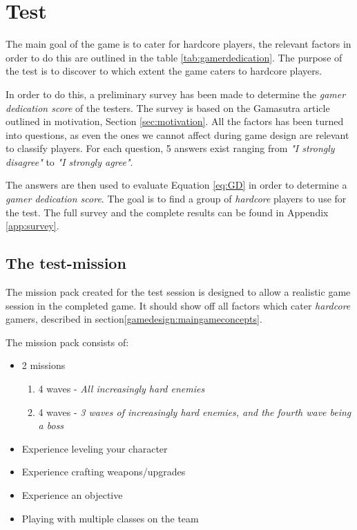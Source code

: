 \chapter{Test}
The main goal of the game is to cater for hardcore players, the relevant factors in order to do this are outlined in the table \ref{tab:gamerdedication}.
The purpose of the test is to discover to which extent the game caters to hardcore players.

In order to do this, a preliminary survey has been made to determine the \emph{gamer dedication score} of the testers.
The survey is based on the Gamasutra article\cite{casual_vs_hardcore} outlined in motivation, Section \ref{sec:motivation}.
All the factors has been turned into questions, as even the ones we cannot affect during game design are relevant to classify players.
For each question, 5 answers exist ranging from \textit{"I strongly disagree"} to \textit{"I strongly agree"}.

The answers are then used to evaluate Equation \ref{eq:GD} in order to determine a \emph{gamer dedication score}.
The goal is to find a group of \emph{hardcore} players to use for the test.
The full survey and the complete results can be found in Appendix \ref{app:survey}.

\section{The test-mission}
The mission pack created for the test session is designed to allow a realistic game session in the completed game.
It should show off all factors which cater \emph{hardcore} gamers, described in section\ref{gamedesign:maingameconcepts}.

The mission pack consists of:

\begin{itemize}
	\item 2 missions
	\begin{enumerate}
		\item 4 waves - \emph{All increasingly hard enemies}
		\item 4 waves - \emph{3 waves of increasingly hard enemies, and the fourth wave being a boss}
	\end{enumerate}
	\item Experience leveling your character
	\item Experience crafting weapons/upgrades
	\item Experience an objective
	\item Playing with multiple classes on the team
\end{itemize}

